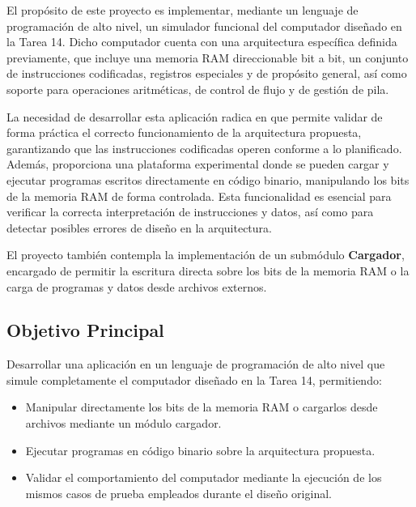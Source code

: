\documentclass{article}
\begin{document}
El propósito de este proyecto es implementar, mediante un lenguaje de programación de alto nivel, un simulador funcional del computador diseñado en la Tarea 14. Dicho computador cuenta con una arquitectura específica definida previamente, que incluye una memoria RAM direccionable bit a bit, un conjunto de instrucciones codificadas, registros especiales y de propósito general, así como soporte para operaciones aritméticas, de control de flujo y de gestión de pila.

La necesidad de desarrollar esta aplicación radica en que permite validar de forma práctica el correcto funcionamiento de la arquitectura propuesta, garantizando que las instrucciones codificadas operen conforme a lo planificado. Además, proporciona una plataforma experimental donde se pueden cargar y ejecutar programas escritos directamente en código binario, manipulando los bits de la memoria RAM de forma controlada. Esta funcionalidad es esencial para verificar la correcta interpretación de instrucciones y datos, así como para detectar posibles errores de diseño en la arquitectura.

El proyecto también contempla la implementación de un submódulo \textbf{Cargador}, encargado de permitir la escritura directa sobre los bits de la memoria RAM o la carga de programas y datos desde archivos externos.


\subsection{Objetivo Principal}

Desarrollar una aplicación en un lenguaje de programación de alto nivel que simule completamente el computador diseñado en la Tarea 14, permitiendo:

\begin{itemize}
  \item Manipular directamente los bits de la memoria RAM o cargarlos desde archivos mediante un módulo cargador.
  \item Ejecutar programas en código binario sobre la arquitectura propuesta.
  \item Validar el comportamiento del computador mediante la ejecución de los mismos casos de prueba empleados durante el diseño original.
\end{itemize}

\end{document}

